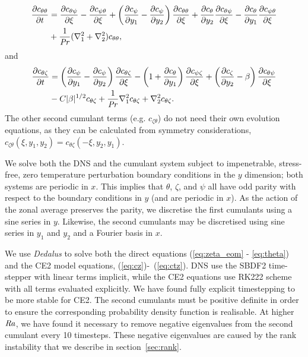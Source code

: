 \documentclass{jfm}
\newcommand{\cz}{c_{\zeta}}
\newcommand{\cs}{c_{\psi}}
\newcommand{\ct}{c_{\theta}}
\newcommand{\csz}{c_{\psi \zeta}}
\newcommand{\ctz}{c_{\theta \zeta}}
\newcommand{\czt}{c_{\zeta \theta}}
\newcommand{\ctt}{c_{\theta \theta}}
\newcommand{\cst}{c_{\psi \theta}}
\newcommand{\cts}{c_{\theta \psi}}
\newcommand{\Rayleigh}{\mbox{\textit{Ra}}}  %
\begin{document}
\begin{equation}
  \label{eq:ctt}
\begin{split}
  \pdv{\ctt}{t} &= \pdv{\cts}{\xi} - \pdv{\cst}{\xi} + \left(\pdv{\cs}{y_1} - \pdv{\cs}{y_2}\right)\pdv{\ctt}{\xi} + \pdv{\ct}{y_2}\pdv{\cts}{\xi} - \pdv{\ct}{y_1}\pdv{\cst}{\xi}\\
&  + \frac{1}{\Pran}(\nabla_1^2 + \nabla_2^2) \ctt,
\end{split}
\end{equation}
and
\begin{equation}
  \label{eq:ctz}
  \begin{split}
    \pdv{\ctz}{t} &= \left(\pdv{\cs}{y_1} - \pdv{\cs}{y_2}\right) \pdv{\ctz}{\xi} - \left(1 + \pdv{\ct}{y_1}\right) \pdv{\csz}{\xi} + \left(\pdv{\cz}{y_2} - \beta\right) \pdv{\cts}{\xi}\\
    &  - C |\beta|^{1/2} \ctz + \frac{1}{\Pran} \nabla_1^2 \ctz + \nabla_2^2 \ctz.
  \end{split}
\end{equation}
The other second cumulant terms (e.g. $\czt$) do not need their own evolution equations, as they can be calculated from symmetry considerations, $\czt(\xi, y_1, y_2) = \ctz(-\xi, y_2, y_1)$.

We solve both the DNS and the cumulant system subject to impenetrable, stress-free, zero temperature perturbation boundary conditions in the $y$ dimension; both systems are periodic in $x$. 
This implies that $\theta$, $\zeta$, and $\psi$ all have odd parity with respect to the boundary conditions in $y$ (and are periodic in $x$). As
the action of the zonal average preserves the parity, we discretise the first cumulants using a sine series in $y$. Likewise,
the second cumulants may be discretised using sine series in $y_1$ and $y_2$ and a Fourier basis in $x$.

We use \emph{Dedalus} \citep{2020PhRvR...2b3068B} to solve both the direct equations (\ref{eq:zeta_eom} - \ref{eq:theta}) and the CE2 model equations, (\ref{eq:cz})-~(\ref{eq:ctz}).
DNS use the SBDF2 time-stepper with linear terms implicit, while
the CE2 equations use RK222 scheme with all terms evaluated explicitly.
We have found fully explicit timestepping to be more stable for CE2.
The second cumulants must be positive definite in order to ensure the corresponding probability density function is realisable.
At higher $\Rayleigh$, we have found it necessary to remove negative eigenvalues from the second cumulant every 10 timesteps.
These negative eigenvalues are caused by the rank instability that we describe in section~\ref{sec:rank}.
\end{document}
